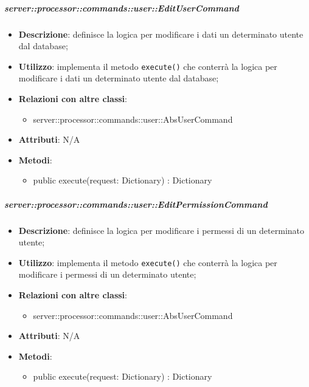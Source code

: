         \subparagraph{server::processor::commands::user::EditUserCommand} %
        \label{subp:bdsm_app_server_processor_commands_user_editusercommand}
        \begin{itemize}
          \item \textbf{Descrizione}: definisce la logica per modificare i dati un determinato utente dal database;
          \item \textbf{Utilizzo}: implementa il metodo \texttt{execute()} che conterrà la logica per modificare i dati un determinato utente dal database;
          \item \textbf{Relazioni con altre classi}:
            \begin{itemize}
              \item server::processor::commands::user::AbsUserCommand
            \end{itemize}
			\item \textbf{Attributi}: N/A
			\item \textbf{Metodi}:
        	\begin{itemize}
          		\item public execute(request: Dictionary) : Dictionary
        	\end{itemize}
        \end{itemize}

        \subparagraph{server::processor::commands::user::EditPermissionCommand} %
        \label{subp:bdsm_app_server_processor_commands_user_editpermissioncommand}
        \begin{itemize}
          \item \textbf{Descrizione}: definisce la logica per modificare i permessi di un determinato utente;
          \item \textbf{Utilizzo}: implementa il metodo \texttt{execute()} che conterrà la logica per modificare i permessi di un determinato utente;
          \item \textbf{Relazioni con altre classi}:
            \begin{itemize}
              \item server::processor::commands::user::AbsUserCommand
            \end{itemize}
			\item \textbf{Attributi}: N/A
			\item \textbf{Metodi}:
        	\begin{itemize}
          		\item public execute(request: Dictionary) : Dictionary
        	\end{itemize}
        \end{itemize}

